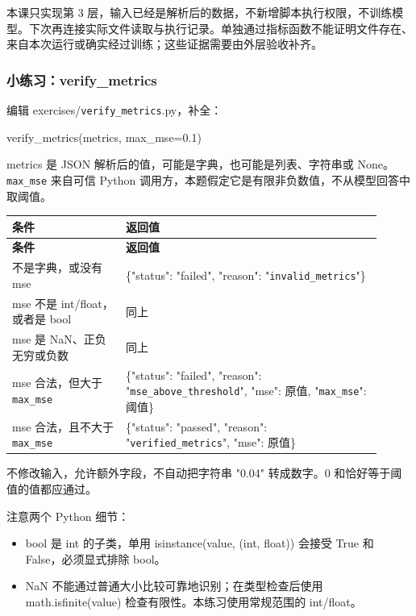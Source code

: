 本课只实现第 3 层，输入已经是解析后的数据，不新增脚本执行权限，不训练模型。下次再连接实际文件读取与执行记录。单独通过指标函数不能证明文件存在、来自本次运行或确实经过训练；这些证据需要由外层验收补齐。

\subsubsection{小练习：verify\_metrics}

编辑 exercises/\nolinkurl{verify_metrics}.py，补全：

\begin{Code}
verify_metrics(metrics, max_mse=0.1)
\end{Code}

metrics 是 JSON 解析后的值，可能是字典，也可能是列表、字符串或 None。\nolinkurl{max_mse} 来自可信 Python 调用方，本题假定它是有限非负数值，不从模型回答中取阈值。

{\small\setlength{\tabcolsep}{4pt}
\renewcommand{\arraystretch}{1.25}
\begin{longtable}{>{\raggedright\arraybackslash}p{0.28\linewidth}>{\raggedright\arraybackslash}p{0.63\linewidth}}
\toprule
\textbf{条件} & \textbf{返回值} \\
\midrule\endfirsthead
\toprule
\textbf{条件} & \textbf{返回值} \\
\midrule\endhead
\bottomrule\endfoot
不是字典，或没有 mse & \{"status": "failed", "reason": "\nolinkurl{invalid_metrics}"\} \\
mse 不是 int/float，或者是 bool & 同上 \\
mse 是 NaN、正负无穷或负数 & 同上 \\
mse 合法，但大于 \nolinkurl{max_mse} & \{"status": "failed", "reason": "\nolinkurl{mse_above_threshold}", "mse": 原值, "\nolinkurl{max_mse}": 阈值\} \\
mse 合法，且不大于 \nolinkurl{max_mse} & \{"status": "passed", "reason": "\nolinkurl{verified_metrics}", "mse": 原值\} \\
\end{longtable}}

不修改输入，允许额外字段，不自动把字符串 "0.04" 转成数字。0 和恰好等于阈值的值都应通过。

注意两个 Python 细节：

\begin{itemize}
\item bool 是 int 的子类，单用 isinstance(value, (int, float)) 会接受 True 和 False，必须显式排除 bool。
\item NaN 不能通过普通大小比较可靠地识别；在类型检查后使用 math.isfinite(value) 检查有限性。本练习使用常规范围的 int/float。
\end{itemize}

